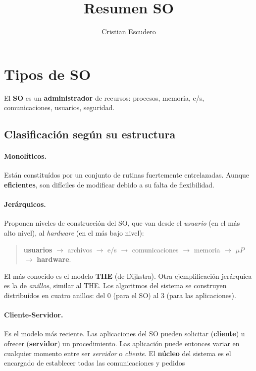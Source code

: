 \documentclass[10pt,a4paper]{article}
\author{Cristian Escudero}
\title{Resumen SO}
\begin{document}
\maketitle
\section{Tipos de SO}
El \textbf{SO} es un \textbf{administrador} de recursos: procesos, memoria, e/s, comunicaciones, usuarios, seguridad.

\subsection{Clasificación según su estructura}
\paragraph{Monolíticos.} Están constituídos por un conjunto de rutinas fuertemente entrelazadas. Aunque \textbf{eficientes}, son difíciles de modificar debido a su falta de flexibilidad.

\paragraph{Jerárquicos.} Proponen niveles de construcción del SO, que van desde el \textit{usuario} (en el más alto nivel), al \textit{hardware} (en el más bajo nivel):

\begin{quote}
\textbf{usuarios} $\rightarrow$ archivos $\rightarrow$ e/s $\rightarrow$ comunicaciones $\rightarrow$ memoria $\rightarrow$ $\mu P$ $\rightarrow$ \textbf{hardware}.
\end{quote}

El más conocido es el modelo \textbf{THE} (de Dijkstra). Otra ejemplificación jerárquica es la de \textit{anillos}, similar al THE. Los algoritmos del sistema se construyen distribuídos en cuatro anillos: del 0 (para el SO) al 3 (para las aplicaciones).

\paragraph{Cliente-Servidor.} Es el modelo más reciente. Las aplicaciones del SO pueden solicitar (\textbf{cliente}) u ofrecer (\textbf{servidor}) un procedimiento. Las aplicación puede entonces variar en cualquier momento entre ser \textit{servidor} o \textit{cliente}. El \textbf{núcleo} del sistema es el encargado de establecer todas las comunicaciones y pedidos
\end{document}
